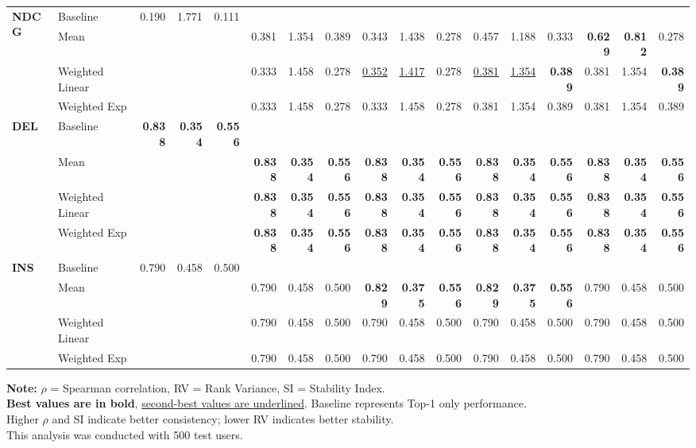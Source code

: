 \documentclass{article}
\begin{document}
\begin{table}[htbp]
\begin{tabular}{@{}llrrr|rrr|rrr|rrr|rrr@{}}
\multirow{4}{*}{\textbf{NDCG}} 
& Baseline & 0.190 & 1.771 & 0.111 & & & & & & & & & & & & \\
& Mean & & & & 0.381 & 1.354 & 0.389 & 0.343 & 1.438 & 0.278 & 0.457 & 1.188 & 0.333 & \textbf{0.629} & \textbf{0.812} & 0.278 \\
& Weighted Linear & & & & 0.333 & 1.458 & 0.278 & \uline{0.352} & \uline{1.417} & 0.278 & \uline{0.381} & \uline{1.354} & \textbf{0.389} & 0.381 & 1.354 & \textbf{0.389} \\
& Weighted Exp & & & & 0.333 & 1.458 & 0.278 & 0.333 & 1.458 & 0.278 & 0.381 & 1.354 & 0.389 & 0.381 & 1.354 & 0.389 \\
\midrule

\multirow{4}{*}{\textbf{DEL}} 
& Baseline & \textbf{0.838} & \textbf{0.354} & \textbf{0.556} & & & & & & & & & & & & \\
& Mean & & & & \textbf{0.838} & \textbf{0.354} & \textbf{0.556} & \textbf{0.838} & \textbf{0.354} & \textbf{0.556} & \textbf{0.838} & \textbf{0.354} & \textbf{0.556} & \textbf{0.838} & \textbf{0.354} & \textbf{0.556} \\
& Weighted Linear & & & & \textbf{0.838} & \textbf{0.354} & \textbf{0.556} & \textbf{0.838} & \textbf{0.354} & \textbf{0.556} & \textbf{0.838} & \textbf{0.354} & \textbf{0.556} & \textbf{0.838} & \textbf{0.354} & \textbf{0.556} \\
& Weighted Exp & & & & \textbf{0.838} & \textbf{0.354} & \textbf{0.556} & \textbf{0.838} & \textbf{0.354} & \textbf{0.556} & \textbf{0.838} & \textbf{0.354} & \textbf{0.556} & \textbf{0.838} & \textbf{0.354} & \textbf{0.556} \\
\midrule

\multirow{4}{*}{\textbf{INS}} 
& Baseline & 0.790 & 0.458 & 0.500 & & & & & & & & & & & & \\
& Mean & & & & 0.790 & 0.458 & 0.500 & \textbf{0.829} & \textbf{0.375} & \textbf{0.556} & \textbf{0.829} & \textbf{0.375} & \textbf{0.556} & 0.790 & 0.458 & 0.500 \\
& Weighted Linear & & & & 0.790 & 0.458 & 0.500 & 0.790 & 0.458 & 0.500 & 0.790 & 0.458 & 0.500 & 0.790 & 0.458 & 0.500 \\
& Weighted Exp & & & & 0.790 & 0.458 & 0.500 & 0.790 & 0.458 & 0.500 & 0.790 & 0.458 & 0.500 & 0.790 & 0.458 & 0.500 \\

\bottomrule
\end{tabular}
\begin{flushleft}
\textbf{Note:} $\rho$ = Spearman correlation, RV = Rank Variance, SI = Stability Index. \\
\textbf{Best values are in bold}, \uline{second-best values are underlined}. Baseline represents Top-1 only performance. \\
Higher $\rho$ and SI indicate better consistency; lower RV indicates better stability. \\
This analysis was conducted with 500 test users.
\end{flushleft}
\end{table}
\end{document}
